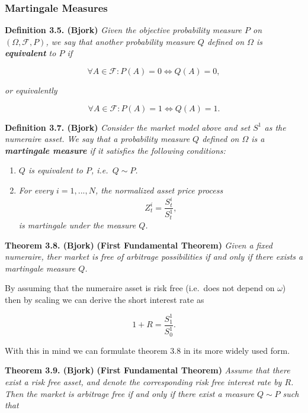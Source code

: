 \documentclass[a4paper,12pt,openany]{book}
\providecommand{\tightlist}{%
 \setlength{\itemsep}{0pt}\setlength{\parskip}{0pt}}
\begin{document}
\hypertarget{martingale-measures}{%
\subsubsection{Martingale Measures}\label{martingale-measures}}

\textbf{Definition 3.5. (Bjork)} \emph{Given the objective probability measure \(P\) on \((\Omega,\mathcal{F},P)\), we say that another probability measure \(Q\) defined on \(\Omega\) is \textbf{equivalent} to \(P\) if}

\[
\forall A\in\mathcal{F}:P(A)=0\iff Q(A)=0,
\]

\emph{or equivalently}

\[
\forall A\in\mathcal{F}:P(A)=1\iff Q(A)=1.
\]

\textbf{Definition 3.7. (Bjork)} \emph{Consider the market model above and set \(S^1\) as the numeraire asset. We say that a probability measure \(Q\) defined on \(\Omega\) is a \textbf{martingale measure} if it satisfies the following conditions:}

\begin{enumerate}
\def\labelenumi{\arabic{enumi}.}
\tightlist
\item
  \emph{\(Q\) is equivalent to \(P\), i.e.~\(Q\sim P\).}
\item
  \emph{For every \(i=1,...,N\), the normalized asset price process}
  \[
    Z_t^i=\frac{S_t^i}{S_t^1},
    \]
  \emph{is martingale under the measure \(Q\).}
\end{enumerate}

\textbf{Theorem 3.8. (Bjork)} \textbf{(First Fundamental Theorem)} \emph{Given a fixed numeraire, ther market is free of arbitrage possibilities if and only if there exists a martingale measure \(Q\).}

By assuming that the numeraire asset is risk free (i.e.~does not depend on \(\omega\)) then by scaling we can derive the short interest rate as

\[
1+R=\frac{S_1^1}{S_0^1}.
\]

With this in mind we can formulate theorem 3.8 in its more widely used form.

\textbf{Theorem 3.9. (Bjork)} \textbf{(First Fundamental Theorem)} \emph{Assume that there exist a risk free asset, and denote the corresponding risk free interest rate by \(R\). Then the market is arbitrage free if and only if there exist a measure \(Q\sim P\) such that}
\end{document}
